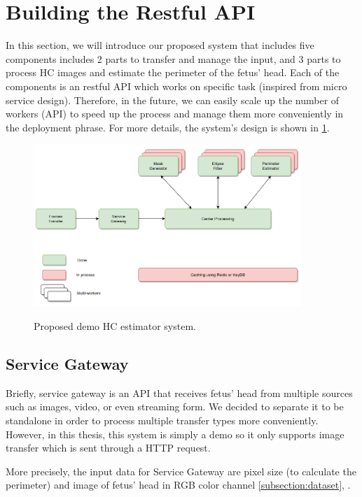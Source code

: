 \section{Building the Restful API}
\noindent

	In this section, we will introduce our proposed system that includes five components includes 2 parts to transfer and manage the input, and 3 parts to process HC images and estimate the perimeter of the fetus' head. Each of the components is an restful API which works on specific task (inspired from micro service design). Therefore, in the future, we can easily scale up the number of workers (API) to speed up the process and manage them more conveniently in the deployment phrase. For more details, the system's design is shown in \ref{fig:hc_system}.
	
	\begin{figure}[H]
		\centering
		{\includegraphics[width=0.9\textwidth]{./hinhanh/chap6/hc_system.png}}
		\caption{Proposed demo HC estimator system.}
		\label{fig:hc_system}
	\end{figure}

\subsection{Service Gateway}
\noindent

	Briefly, service gateway is an API that receives fetus' head from multiple sources such as images, video, or even streaming form. We decided to separate it to be standalone in order to process multiple transfer types more conveniently. However, in this thesis, this system is simply a demo so it only supports image transfer which is sent through a HTTP request.
	
	More precisely, the input data for Service Gateway are pixel size (to calculate the perimeter) and image of fetus' head in RGB color channel \ref{subsection:dataset}, .
	
